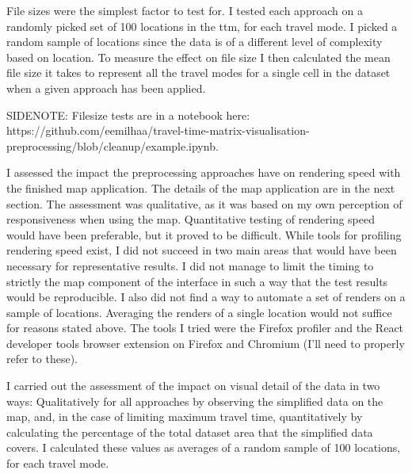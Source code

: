File sizes were the simplest factor to test for.
I tested each approach on
a randomly picked set of 100 locations in the \acrshort{ttm},
for each travel mode.
I picked a random sample of locations since the
data is of a different level of complexity based on location.
To measure the effect on file size I then calculated the mean file size it takes to represent
all the travel modes for a single cell in the dataset
when a given approach has been applied.

SIDENOTE: Filesize tests are in a notebook here: https://github.com/eemilhaa/travel-time-matrix-visualisation-preprocessing/blob/cleanup/example.ipynb.

I assessed the impact the preprocessing approaches have on rendering speed
with the finished map application.
The details of the map application are in the next section.
The assessment was qualitative,
as it was based on my own perception of responsiveness when using the map.
Quantitative testing of rendering speed would have been preferable,
but it proved to be difficult.
While tools for profiling rendering speed exist,
I did not succeed in two main areas
that would have been necessary for representative results.
I did not manage to limit the timing to strictly the map
component of the interface in such a way that
the test results would be reproducible.
I also did not find a way to automate a set of renders
on a sample of locations.
Averaging the renders of a single location would not suffice
for reasons stated above.
The tools I tried were the Firefox profiler
and the React developer tools browser extension on Firefox and Chromium
(I'll need to properly refer to these).

I carried out the assessment of the impact on visual detail of the data in two ways:
Qualitatively for all approaches by observing the simplified data on the map,
and, in the case of limiting maximum travel time,
quantitatively by calculating the percentage of the total dataset area that the simplified data covers.
I calculated these values as averages of a random sample of 100 locations, for each travel mode.

